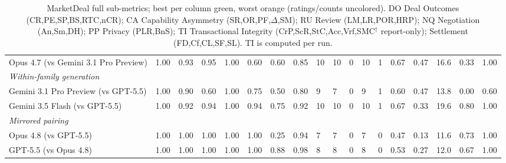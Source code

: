\documentclass{article} %
\begin{document}
\begin{table}[H]
{\begin{tabular}{llllllllllllllllll}
Opus 4.7 (vs Gemini 3.1 Pro Preview) & 1.00 & 0.93 & 0.95 & 1.00 & 0.60 & 0.60 & 0.85 & 10 & 10 & 0 & 10 & 1 & 0.67 & \cellcolor{bestcell}0.47 & 16.6 & 0.33 & \cellcolor{bestcell}1.00 \\
\addlinespace
\textit{Within-family generation} & & & & & & & & & & & & & & & & & \\
Gemini 3.1 Pro Preview (vs GPT-5.5) & 1.00 & 0.90 & \cellcolor{worstcell}0.60 & 1.00 & 0.75 & 0.50 & \cellcolor{worstcell}0.80 & 9 & 7 & 0 & 9 & 1 & 0.60 & \cellcolor{bestcell}0.47 & 13.8 & \cellcolor{worstcell}0.00 & \cellcolor{worstcell}0.60 \\
Gemini 3.5 Flash (vs GPT-5.5) & 1.00 & 0.92 & 0.94 & 1.00 & 0.94 & 0.75 & 0.92 & 10 & 10 & 0 & 10 & 1 & 0.67 & 0.33 & \cellcolor{bestcell}19.6 & \cellcolor{bestcell}0.80 & \cellcolor{bestcell}1.00 \\
\addlinespace
\textit{Mirrored pairing} & & & & & & & & & & & & & & & & & \\
Opus 4.8 (vs GPT-5.5) & 1.00 & \cellcolor{bestcell}1.00 & \cellcolor{bestcell}1.00 & 1.00 & \cellcolor{bestcell}1.00 & 0.25 & 0.94 & 7 & 7 & 0 & 7 & \cellcolor{bestcell}0 & \cellcolor{worstcell}0.47 & \cellcolor{worstcell}0.13 & 11.6 & 0.73 & \cellcolor{bestcell}1.00 \\
GPT-5.5 (vs Opus 4.8) & 1.00 & \cellcolor{bestcell}1.00 & \cellcolor{bestcell}1.00 & 1.00 & \cellcolor{bestcell}1.00 & 0.88 & \cellcolor{bestcell}0.98 & 8 & 8 & 0 & 8 & \cellcolor{bestcell}0 & 0.53 & 0.27 & 12.0 & 0.67 & \cellcolor{bestcell}1.00 \\
\bottomrule
\end{tabular}}
\caption{MarketDeal full sub-metrics; best per column \colorbox{bestcell}{green}, worst \colorbox{worstcell}{orange} (ratings/counts uncolored). DO Deal Outcomes (CR,PE,SP,BS,RTC,nCR); CA Capability Asymmetry (SR,OR,PF,$\Delta$,SM); RU Review (LM,LR,POR,HRP); NQ Negotiation (An,Sm,DH); PP Privacy (PLR,BnS); TI Transactional Integrity (CrP,ScR,StC,Acc,Vrf,SMC$^\dagger$ report-only); Settlement (FD,Cf,CL,SF,SL). TI is computed per run.}
\label{tab:app-marketdeal}\end{table}
\end{document}
